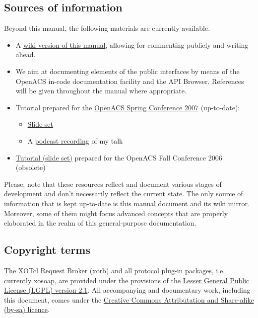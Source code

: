 \subsection{Sources of information}
Beyond this manual, the following materials are currently available.
\begin{itemize}
\item A \href{http://openacs-dotlrn.wu-wien.ac.at}{wiki version of this manual}, allowing for commenting 
publicly and writing ahead.
\item We aim at documenting elements of the public interfaces by means of the OpenACS in-code 
documentation facility and the API Browser. References will be given throughout the manual where 
appropriate.
\item Tutorial prepared for the \href{http://oacs-dotlrn-conf2007.wu-wien.ac.at/}{OpenACS Spring 
Conference 2007} (up-to-date):
\begin{itemize} 
\item \href{http://oacs-dotlrn-conf2007.wu-wien.ac.at/conf2007/file/sobernig-xosoap-slides.pdf?
m=download|Slide set}{Slide set}
\item A \href{http://oacs-dotlrn-conf2007.wu-wien.ac.at/conf2007/file/tutorial-sobernig.mp4?
m=download}{podcast recording} of my talk
\end{itemize}
\item \href{http://nm.wu-wien.ac.at/research/publications/b670.pdf}{Tutorial (slide set)} prepared for the 
OpenACS Fall Conference 2006 (obsolete) 
\end{itemize}
Please, note that these resources reflect and document various stages of development and don't 
necessarily reflect the current state. The only source of information that is kept up-to-date is this manual 
document and its wiki mirror. Moreover, some of them might focus advanced concepts that are properly 
elaborated in the realm of this general-purpose documentation.
\subsection{Copyright terms}
The XOTcl Request Broker (xorb) and all protocol plug-in packages, i.e. currently xosoap, are provided 
under the provisions of the \href{http://creativecommons.org/licenses/LGPL/2.1/}{Lesser General Public 
License (LGPL) version 2.1}. All accompanying and documentary work, including this document, comes 
under the \href{http://creativecommons.org/licenses/by-sa/2.0/at/}{Creative Commons Attributation and 
Share-alike (by-sa) licence}.

